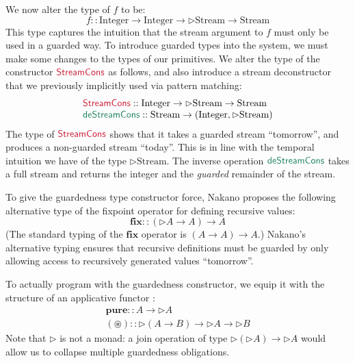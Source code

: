 \documentclass[natbib]{sigplanconf}
\newcommand{\cons}[1]{\textcolor{cons}{\textsf{#1}}}
\newcommand{\elim}[1]{\textcolor{elim}{\textsf{#1}}}
\newcommand{\kw}[1]{\textbf{#1}}
\newcommand{\tyname}[1]{\textrm{#1}}
\newcommand{\ident}[1]{\textit{#1}}
\begin{document}
We now alter the type of $\ident{f}$ to be:
\begin{displaymath}
  \ident{f} :: \tyname{Integer} \to \tyname{Integer} \to \rhd\tyname{Stream} \to \tyname{Stream}
\end{displaymath}
This type captures the intuition that the stream argument to
$\ident{f}$ must only be used in a guarded way. To introduce
guarded types into the system, we must make some changes to the types
of our primitives. We alter the type of the constructor
$\cons{StreamCons}$ as follows, and also introduce a stream
deconstructor that we previously implicitly used via pattern matching:
\begin{displaymath}
  \begin{array}{l}
    \cons{StreamCons} :: \tyname{Integer} \to \rhd\tyname{Stream} \to \tyname{Stream} \\
    \elim{deStreamCons} :: \tyname{Stream} \to (\tyname{Integer}, \rhd\tyname{Stream})
  \end{array}
\end{displaymath}
The type of $\cons{StreamCons}$ shows that it takes a guarded stream
``tomorrow'', and produces a non-guarded stream ``today''. This is in
line with the temporal intuition we have of the type
$\rhd\tyname{Stream}$. The inverse operation $\elim{deStreamCons}$
takes a full stream and returns the integer and the \emph{guarded}
remainder of the stream.

To give the guardedness type constructor force, Nakano proposes the
following alternative type of the fixpoint operator for defining
recursive values:
\begin{displaymath}
  \kw{fix} :: (\rhd A \to A) \to A
\end{displaymath}
(The standard typing of the $\kw{fix}$ operator is $(A \to A) \to
A$.) Nakano's alternative typing ensures that recursive definitions
must be guarded by only allowing access to recursively generated
values ``tomorrow''.

To actually program with the guardedness constructor, we equip it with
the structure of an applicative functor \cite{mcbride08applicative}:
\begin{displaymath}
  \begin{array}{l}
    \kw{pure} :: A \to \rhd A \\
    \kw{$(\circledast)$} :: \rhd (A \to B) \to \rhd A \to \rhd B
  \end{array}
\end{displaymath}
Note that $\rhd$ is not a monad: a join operation of type $\rhd(\rhd
A) \to \rhd A$ would allow us to collapse multiple guardedness
obligations.
\end{document}
